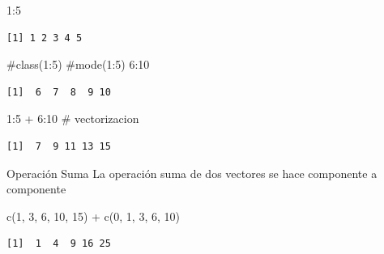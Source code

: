\documentclass[
  ignorenonframetext,
  aspectratio=169,
  spanish,
]{beamer}
\newenvironment{Shaded}{\begin{snugshade}}{\end{snugshade}}
\newcommand{\CommentTok}[1]{\textcolor[rgb]{0.37,0.37,0.37}{#1}}
\newcommand{\DecValTok}[1]{\textcolor[rgb]{0.68,0.00,0.00}{#1}}
\newcommand{\FunctionTok}[1]{\textcolor[rgb]{0.28,0.35,0.67}{#1}}
\newcommand{\NormalTok}[1]{\textcolor[rgb]{0.00,0.23,0.31}{#1}}
\newcommand{\SpecialCharTok}[1]{\textcolor[rgb]{0.37,0.37,0.37}{#1}}
\begin{document}
\begin{frame}[fragile]{}
\label{section}
\begin{Shaded}
\begin{Highlighting}[]
\DecValTok{1}\SpecialCharTok{:}\DecValTok{5}
\end{Highlighting}
\end{Shaded}

\begin{verbatim}
[1] 1 2 3 4 5
\end{verbatim}

\begin{Shaded}
\begin{Highlighting}[]
\CommentTok{\#class(1:5)}
\CommentTok{\#mode(1:5)}
\DecValTok{6}\SpecialCharTok{:}\DecValTok{10}
\end{Highlighting}
\end{Shaded}

\begin{verbatim}
[1]  6  7  8  9 10
\end{verbatim}

\begin{Shaded}
\begin{Highlighting}[]
\DecValTok{1}\SpecialCharTok{:}\DecValTok{5} \SpecialCharTok{+} \DecValTok{6}\SpecialCharTok{:}\DecValTok{10} \CommentTok{\# vectorizacion  }
\end{Highlighting}
\end{Shaded}

\begin{verbatim}
[1]  7  9 11 13 15
\end{verbatim}
\end{frame}

\begin{frame}[fragile]{Operación Suma}
\label{operaciuxf3n-suma}
La operación suma de dos vectores se hace componente a componente

\begin{Shaded}
\begin{Highlighting}[]
\FunctionTok{c}\NormalTok{(}\DecValTok{1}\NormalTok{, }\DecValTok{3}\NormalTok{, }\DecValTok{6}\NormalTok{, }\DecValTok{10}\NormalTok{, }\DecValTok{15}\NormalTok{) }\SpecialCharTok{+} \FunctionTok{c}\NormalTok{(}\DecValTok{0}\NormalTok{, }\DecValTok{1}\NormalTok{, }\DecValTok{3}\NormalTok{, }\DecValTok{6}\NormalTok{, }\DecValTok{10}\NormalTok{) }
\end{Highlighting}
\end{Shaded}

\begin{verbatim}
[1]  1  4  9 16 25
\end{verbatim}
\end{frame}
\end{document}
